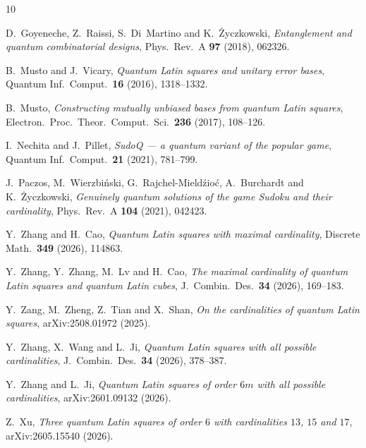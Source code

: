 \documentclass[11pt]{amsart}
\theoremstyle{definition}
\begin{document}
\begin{thebibliography}{10}

D.~Goyeneche, Z.~Raissi, S.~Di~Martino and K.~\.Zyczkowski,
\emph{Entanglement and quantum combinatorial designs},
Phys.\ Rev.\ A \textbf{97} (2018), 062326.

B.~Musto and J.~Vicary,
\emph{Quantum Latin squares and unitary error bases},
Quantum Inf.\ Comput.\ \textbf{16} (2016), 1318--1332.

B.~Musto,
\emph{Constructing mutually unbiased bases from quantum Latin squares},
Electron.\ Proc.\ Theor.\ Comput.\ Sci.\ \textbf{236} (2017), 108--126.

I.~Nechita and J.~Pillet,
\emph{SudoQ --- a quantum variant of the popular game},
Quantum Inf.\ Comput.\ \textbf{21} (2021), 781--799.

J.~Paczos, M.~Wierzbi\'nski, G.~Rajchel-Mield\'zio\'c, A.~Burchardt and
K.~\.Zyczkowski,
\emph{Genuinely quantum solutions of the game Sudoku and their cardinality},
Phys.\ Rev.\ A \textbf{104} (2021), 042423.

Y.~Zhang and H.~Cao,
\emph{Quantum Latin squares with maximal cardinality},
Discrete Math.\ \textbf{349} (2026), 114863.

Y.~Zhang, Y.~Zhang, M.~Lv and H.~Cao,
\emph{The maximal cardinality of quantum Latin squares and quantum Latin
cubes},
J.\ Combin.\ Des.\ \textbf{34} (2026), 169--183.

Y.~Zang, M.~Zheng, Z.~Tian and X.~Shan,
\emph{On the cardinalities of quantum Latin squares},
arXiv:2508.01972 (2025).

Y.~Zhang, X.~Wang and L.~Ji,
\emph{Quantum Latin squares with all possible cardinalities},
J.\ Combin.\ Des.\ \textbf{34} (2026), 378--387.

Y.~Zhang and L.~Ji,
\emph{Quantum Latin squares of order $6m$ with all possible cardinalities},
arXiv:2601.09132 (2026).

Z.~Xu,
\emph{Three quantum Latin squares of order $6$ with cardinalities $13$, $15$
and $17$},
arXiv:2605.15540 (2026).

\end{thebibliography}
\end{document}
